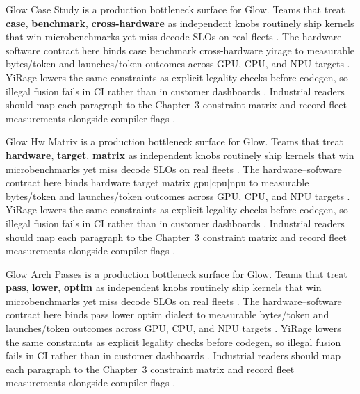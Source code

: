 Glow Case Study is a production bottleneck surface for Glow. Teams that treat \textbf{case}, \textbf{benchmark}, \textbf{cross-hardware} as independent knobs routinely ship kernels that win microbenchmarks yet miss decode SLOs on real fleets \citep{taxbreak2026,semianalysis2024tma}. The hardware--software contract here binds case benchmark cross-hardware yirage to measurable bytes/token and launches/token outcomes across GPU, CPU, and NPU targets \citep{memoryfloor2026,amd2024xdna}. YiRage lowers the same constraints as explicit legality checks before codegen, so illegal fusion fails in CI rather than in customer dashboards \citep{nvidia2022hopper,amd2024aie}. Industrial readers should map each paragraph to the Chapter~3 constraint matrix and record fleet measurements alongside compiler flags \citep{semianalysis2024tma,dlbook}.

Glow Hw Matrix is a production bottleneck surface for Glow. Teams that treat \textbf{hardware}, \textbf{target}, \textbf{matrix} as independent knobs routinely ship kernels that win microbenchmarks yet miss decode SLOs on real fleets \citep{memoryfloor2026,amd2024xdna}. The hardware--software contract here binds hardware target matrix gpu|cpu|npu to measurable bytes/token and launches/token outcomes across GPU, CPU, and NPU targets \citep{nvidia2022hopper,amd2024aie}. YiRage lowers the same constraints as explicit legality checks before codegen, so illegal fusion fails in CI rather than in customer dashboards \citep{semianalysis2024tma,dlbook}. Industrial readers should map each paragraph to the Chapter~3 constraint matrix and record fleet measurements alongside compiler flags \citep{amd2024xdna,dao2022flashattention}.

Glow Arch Passes is a production bottleneck surface for Glow. Teams that treat \textbf{pass}, \textbf{lower}, \textbf{optim} as independent knobs routinely ship kernels that win microbenchmarks yet miss decode SLOs on real fleets \citep{nvidia2022hopper,amd2024aie}. The hardware--software contract here binds pass lower optim dialect to measurable bytes/token and launches/token outcomes across GPU, CPU, and NPU targets \citep{semianalysis2024tma,dlbook}. YiRage lowers the same constraints as explicit legality checks before codegen, so illegal fusion fails in CI rather than in customer dashboards \citep{amd2024xdna,dao2022flashattention}. Industrial readers should map each paragraph to the Chapter~3 constraint matrix and record fleet measurements alongside compiler flags \citep{amd2024aie,kwon2023vllm}.

